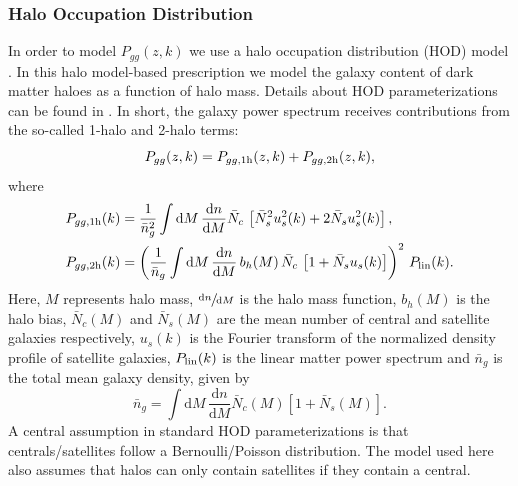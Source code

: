 \documentclass[a4paper,11pt]{article}
\begin{document}
  \subsubsection{Halo Occupation Distribution}\label{sssec:methods.theory.hod}
    In order to model $P_{gg}(z,k)$ we use a halo occupation distribution (HOD) model \citep{2000MNRAS.318.1144P,2002PhR...372....1C,2002ApJ...575..587B,2005ApJ...633..791Z,2013MNRAS.430..725V}. In this halo model-based prescription we model the galaxy content of dark matter haloes as a function of halo mass. Details about HOD parameterizations can be found in \cite{2011ApJ...736...59Z}. In short, the galaxy power spectrum receives contributions from the so-called 1-halo and 2-halo terms:
    \begin{equation}
      P_{gg}(z,k) = P_{gg,{\rm 1h}}(z,k) + P_{gg,{\rm 2h}}(z,k),
    \end{equation}
    where
    \begin{align}
      & P_{gg,{\rm 1h}}(k)=\frac{1}{\bar{n}_g^2} \int \mathrm{d}M\,\frac{\mathrm{d}n}{\mathrm{d}M} \bar{N}_c\,\left[\bar{N}_s^2u_s^2(k)+2\bar{N}_su_s^2(k)\right],\\
      & P_{gg,{\rm 2h}}(k)=\left(\frac{1}{\bar{n}_g} \int \mathrm{d}M\,\frac{\mathrm{d}n}{\mathrm{d}M}\,b_h(M)\,\bar{N}_c\,\left[1+\bar{N}_su_s(k)\right]\right)^2\,P_{\rm lin}(k).
    \end{align}
    Here, $M$ represents halo mass, $\sfrac{\mathrm{d}n}{\mathrm{d}M}$ is the halo mass function, $b_h(M)$ is the halo bias, $\bar{N}_c(M)$ and $\bar{N}_s(M)$ are the mean number of central and satellite galaxies respectively, $u_s(k)$ is the Fourier transform of the normalized density profile of satellite galaxies, $P_{\rm lin}(k)$ is the linear matter power spectrum and $\bar{n}_g$ is the total mean galaxy density, given by
    \begin{equation}
      \bar{n}_g=\int \mathrm{d}M\,\frac{\mathrm{d}n}{\mathrm{d}M}\bar{N}_c(M)\left[1+\bar{N}_s(M)\right].
      \label{eq:ng_hod}
    \end{equation}
    A central assumption in standard HOD parameterizations is that centrals/satellites follow a Bernoulli/Poisson distribution. The model used here also assumes that halos can only contain satellites if they contain a central.
\end{document}
